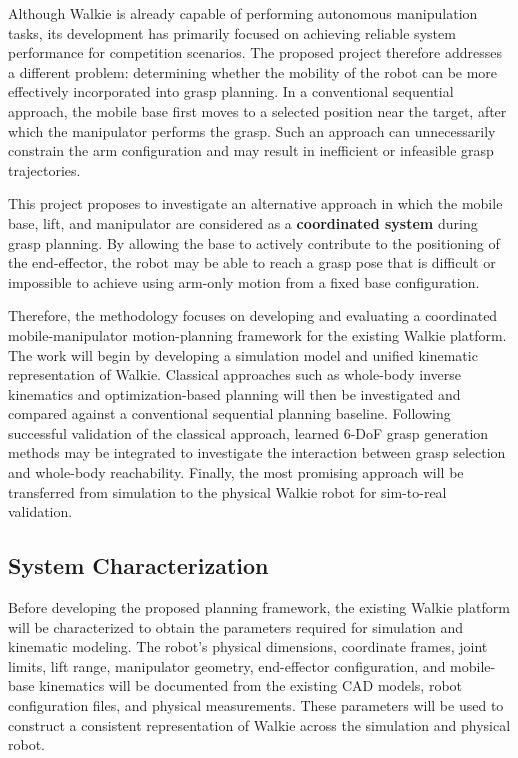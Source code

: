 \documentclass[12pt,a4paper]{article}
\begin{document}
Although Walkie is already capable of performing autonomous manipulation tasks, its
development has primarily focused on achieving reliable system performance for competition
scenarios. The proposed project therefore addresses a different problem: determining whether
the mobility of the robot can be more effectively incorporated into grasp planning. In a
conventional sequential approach, the mobile base first moves to a selected position near the
target, after which the manipulator performs the grasp. Such an approach can unnecessarily
constrain the arm configuration and may result in inefficient or infeasible grasp trajectories.

This project proposes to investigate an alternative approach in which the mobile base,
lift, and manipulator are considered as a \textbf{coordinated system} during grasp planning. By
allowing the base to actively contribute to the positioning of the end-effector, the robot may be
able to reach a grasp pose that is difficult or impossible to achieve using arm-only motion from
a fixed base configuration.

Therefore, the methodology focuses on developing and evaluating a coordinated
mobile-manipulator motion-planning framework for the existing Walkie platform. The work will
begin by developing a simulation model and unified kinematic representation of Walkie.
Classical approaches such as whole-body inverse kinematics and optimization-based planning
will then be investigated and compared against a conventional sequential planning baseline.
Following successful validation of the classical approach, learned 6-DoF grasp generation
methods may be integrated to investigate the interaction between grasp selection and
whole-body reachability. Finally, the most promising approach will be transferred from
simulation to the physical Walkie robot for sim-to-real validation.

\subsection*{System Characterization}

Before developing the proposed planning framework, the existing Walkie platform will
be characterized to obtain the parameters required for simulation and kinematic modeling. The
robot's physical dimensions, coordinate frames, joint limits, lift range, manipulator geometry,
end-effector configuration, and mobile-base kinematics will be documented from the existing
CAD models, robot configuration files, and physical measurements. These parameters will be
used to construct a consistent representation of Walkie across the simulation and physical
robot.
\end{document}
